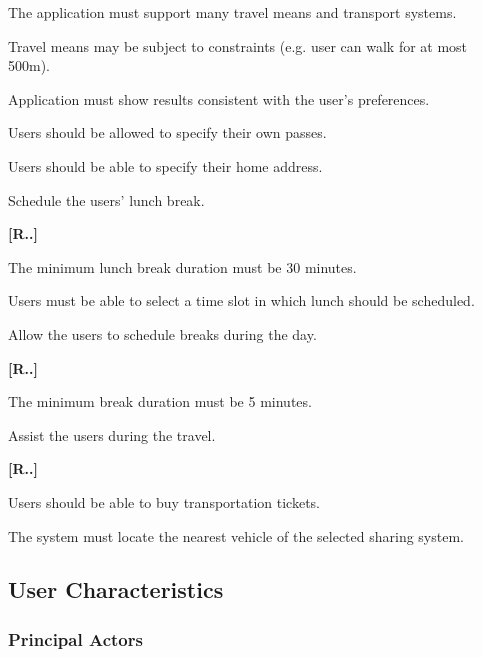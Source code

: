 \begin{list}
\begin{list}
	{
	}
        \item The application must support many travel means and transport systems.
		\item Travel means may be subject to constraints (e.g. user can walk for at most 500m).
		\item Application must show results consistent with the user’s preferences.
		\item Users should be allowed to specify their own passes.
		\item Users should be able to specify their home address.
    \end{list}
    \item Schedule the users’ lunch break.
    \begin{list}
	{\bfseries{}[R..]~}
	{
	}
        \item The minimum lunch break duration must be 30 minutes. 
		\item Users must be able to select a time slot in which lunch should be scheduled.

    \end{list}
    \item Allow the users to schedule breaks during the day.
    \begin{list}
	{\bfseries{}[R..]~}
	{
	}
        \item The minimum break duration must be 5 minutes.
    \end{list}
    \item Assist the users during the travel.
    \begin{list}
	{\bfseries{}[R..]~}
	{
	}
	\item Users should be able to buy transportation tickets.
	\item The system must locate the nearest vehicle of the selected sharing system. 
	\end{list}
\end{list}

\subsection{User Characteristics}

\subsubsection{Principal Actors}


